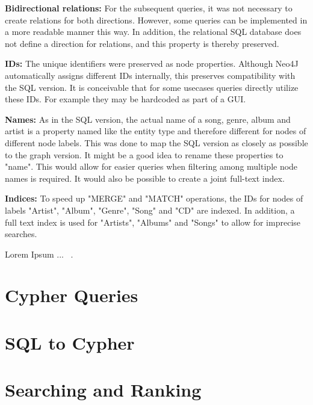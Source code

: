 \documentclass{article}
\begin{document}
\vspace*{2mm}
\noindent
\textbf{Bidirectional relations:} For the subsequent queries, it was not necessary to create relations for both directions. However, some queries can be implemented in a more readable manner this way. In addition, the relational SQL database does not define a direction for relations, and this property is thereby preserved.

\vspace*{2mm}
\noindent
\textbf{IDs:} The unique identifiers were preserved as node properties. Although Neo4J automatically assigns different IDs internally, this preserves compatibility  with the SQL version. It is conceivable that for some usecases queries directly utilize these IDs. For example they may be hardcoded as part of a GUI.

\vspace*{2mm}
\noindent
\textbf{Names:} As in the SQL version, the actual name of a song, genre, album and artist is a property named like the entity type and therefore different for nodes of different node labels. This was done to map the SQL version as closely as possible to the graph version. It might be a good idea to rename these properties to "name". This would allow for easier queries when filtering among multiple node names is required. It would also be possible to create a joint full-text index.

\vspace*{2mm}
\noindent
\textbf{Indices:} To speed up "MERGE" and "MATCH" operations, the IDs for nodes of labels "Artist", "Album", "Genre", "Song" and "CD" are indexed. In addition, a full text index is used for "Artists", "Albums" and "Songs" to allow for imprecise searches.

Lorem Ipsum ... ~\cite{Nobody06}.

\section{Cypher Queries}

\section{SQL to Cypher}

\section{Searching and Ranking}

{}

\end{document}
